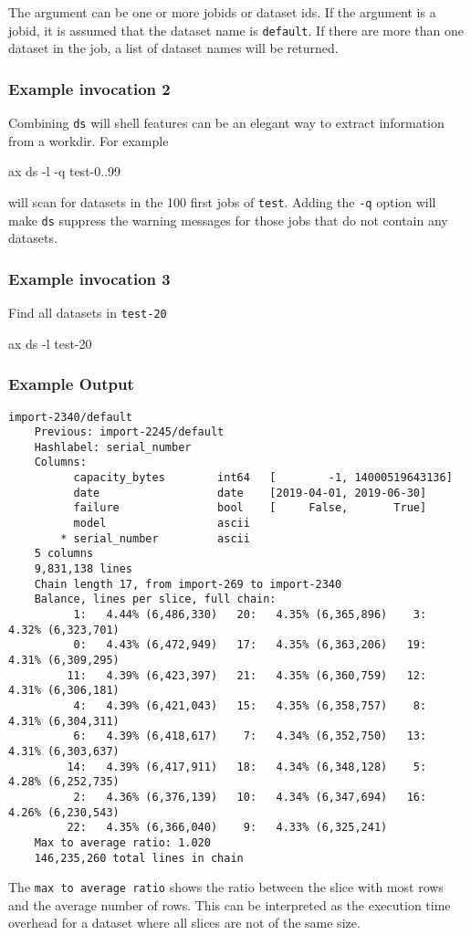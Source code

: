 The argument can be one or more jobids or dataset ids.  If the
argument is a jobid, it is assumed that the dataset name is
\texttt{default}.  If there are more than one dataset in the job, a
list of dataset names will be returned.

\subsubsection*{Example invocation 2}
Combining \texttt{ds} will shell features can be an elegant way to
extract information from a workdir.  For example
\begin{shell}
ax ds -l -q test-{0..99}
\end{shell}
will scan for datasets in the 100 first jobs of \texttt{test}.
Adding the \texttt{-q} option will make \texttt{ds} suppress the
warning messages for those jobs that do not contain any datasets.

\subsubsection*{Example invocation 3}
Find all datasets in \texttt{test-20}
\begin{shell}
ax ds -l test-20
\end{shell}


\subsubsection*{Example Output}
\begin{snugshade}
\begin{verbatim}
import-2340/default
    Previous: import-2245/default
    Hashlabel: serial_number
    Columns:
          capacity_bytes        int64   [        -1, 14000519643136]
          date                  date    [2019-04-01, 2019-06-30]
          failure               bool    [     False,       True]
          model                 ascii
        * serial_number         ascii
    5 columns
    9,831,138 lines
    Chain length 17, from import-269 to import-2340
    Balance, lines per slice, full chain:
          1:   4.44% (6,486,330)   20:   4.35% (6,365,896)    3:   4.32% (6,323,701)
          0:   4.43% (6,472,949)   17:   4.35% (6,363,206)   19:   4.31% (6,309,295)
         11:   4.39% (6,423,397)   21:   4.35% (6,360,759)   12:   4.31% (6,306,181)
          4:   4.39% (6,421,043)   15:   4.35% (6,358,757)    8:   4.31% (6,304,311)
          6:   4.39% (6,418,617)    7:   4.34% (6,352,750)   13:   4.31% (6,303,637)
         14:   4.39% (6,417,911)   18:   4.34% (6,348,128)    5:   4.28% (6,252,735)
          2:   4.36% (6,376,139)   10:   4.34% (6,347,694)   16:   4.26% (6,230,543)
         22:   4.35% (6,366,040)    9:   4.33% (6,325,241)
    Max to average ratio: 1.020
    146,235,260 total lines in chain
\end{verbatim}
\end{snugshade}
The \texttt{max to average ratio} shows the ratio between the slice
with most rows and the average number of rows.  This can be
interpreted as the execution time overhead for a dataset where all
slices are not of the same size.







